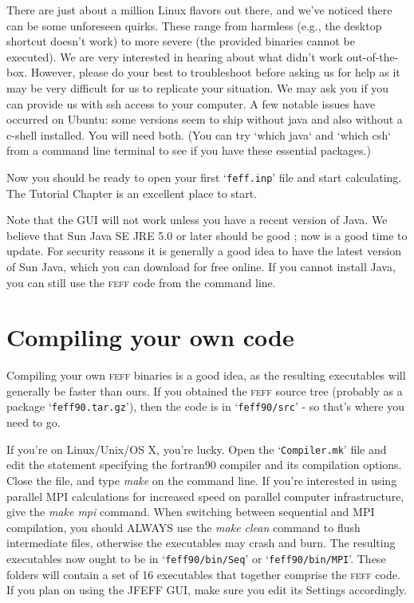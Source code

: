\documentclass[11pt,oneside]{report} %
\renewcommand{\htmlref}[2]{\hyperlink{#2}{#1}}
\newcommand{\program}[1]{\textsc{#1}}
\newcommand{\feff}{\program{feff}}
\newcommand{\file}[1]{`\texttt{#1}'}
\renewcommand{\htmlref}[2]{{#1}} %
\begin{document}
\begin{latexonly}
There are just about a million Linux flavors out there, and we've noticed there can be some unforeseen quirks.  These range from harmless (e.g., the desktop shortcut doesn't work) to more severe (the provided binaries cannot be executed).  We are very interested in hearing about what didn't work out-of-the-box.  However, please do your best to troubleshoot before asking us for help as it may be very difficult for us to replicate your situation.  We may ask you if you can provide us with ssh access to your computer.  A few notable issues have occurred on Ubuntu: some versions seem to ship without java and also without a c-shell installed.  You will need both.  (You can try `which java` and `which csh` from a command line terminal to see if you have these essential packages.)

Now you should be ready to open your first \file{feff.inp} file and start calculating.  The \htmlref{Tutorial Chapter}{sec:tutorial} is an excellent place to start.


Note that the GUI will not work unless you have a recent version of Java.  We believe that Sun Java SE JRE 5.0 or later should be good ; now is a good time to update.  For security reasons it is generally a good idea to have the latest version of Sun Java, which you can download for free online.  If you cannot install Java, you can still use the {\feff} code from the command line.


\section{Compiling your own code}
\label{sec:compilation}

Compiling your own {\feff} binaries is a good idea, as the resulting executables will generally be faster than ours.  If you obtained the {\feff} source tree (probably as a package \file{feff90.tar.gz}), then the code is in \file{feff90/src} - so that's where you need to go.

If you're on Linux/Unix/OS X, you're lucky.  Open the \file{Compiler.mk} file and edit the statement specifying the fortran90 compiler and its compilation options.  Close the file, and type {\it make} on the command line.  If you're interested in using parallel MPI calculations for increased speed on parallel computer infrastructure, give the {\it make mpi} command.  When switching between
sequential and MPI compilation, you should ALWAYS use the {\it make clean} command to flush intermediate files, otherwise the executables may crash and burn.
The resulting executables now ought to be in \file{feff90/bin/Seq} or \file{feff90/bin/MPI}.  These folders will contain a set of 16 executables that together comprise the {\feff} code.  If you plan on using the JFEFF GUI, make sure you edit its Settings accordingly.


\end{latexonly}
\end{document}
